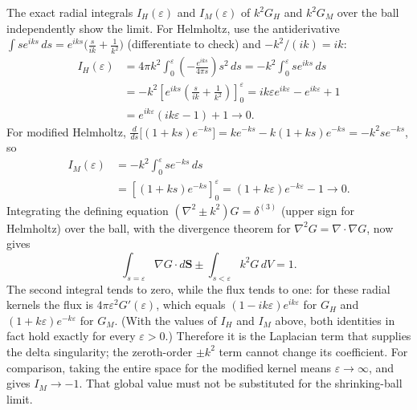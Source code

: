 The exact radial integrals $I_H(\varepsilon)$ and $I_M(\varepsilon)$ of
$k^2G_H$ and $k^2G_M$ over the ball independently show the limit.
For Helmholtz, use the antiderivative
$\int se^{iks}\,ds=e^{iks}\bigl(\frac{s}{ik}+\frac1{k^2}\bigr)$
(differentiate to check) and $-k^2/(ik)=ik$:
\begin{align*}
I_H(\varepsilon)&=4\pi k^2\int_0^\varepsilon
\left(-\frac{e^{iks}}{4\pi s}\right)s^2\,ds
=-k^2\int_0^\varepsilon s e^{iks}\,ds\\
&=-k^2\left[e^{iks}\left(\frac{s}{ik}+\frac1{k^2}\right)\right]_0^\varepsilon
=ik\varepsilon e^{ik\varepsilon}-e^{ik\varepsilon}+1\\
&=e^{ik\varepsilon}(ik\varepsilon-1)+1\longrightarrow0.
\end{align*}
For modified Helmholtz,
$\frac{d}{ds}\bigl[(1+ks)e^{-ks}\bigr]=ke^{-ks}-k(1+ks)e^{-ks}
=-k^2se^{-ks}$, so
\begin{align*}
I_M(\varepsilon)&=-k^2\int_0^\varepsilon s e^{-ks}\,ds\\
&=\left[(1+ks)e^{-ks}\right]_0^\varepsilon
=(1+k\varepsilon)e^{-k\varepsilon}-1\longrightarrow0.
\end{align*}
Integrating the defining equation $(\nabla^2\pm k^2)G=\delta^{(3)}$
(upper sign for Helmholtz) over the ball, with the divergence theorem for
$\nabla^2G=\nabla\cdot\nabla G$, now gives
\[
\int_{s=\varepsilon}\nabla G\cdot d\mathbf S
\ \mathord{\pm}\ \int_{s<\varepsilon}k^2G\,dV=1.
\]
The second integral tends to zero, while the flux tends to one: for
these radial kernels the flux is $4\pi\varepsilon^2G'(\varepsilon)$,
which equals $(1-ik\varepsilon)e^{ik\varepsilon}$ for $G_H$ and
$(1+k\varepsilon)e^{-k\varepsilon}$ for $G_M$. (With the values of
$I_H$ and $I_M$ above, both identities in fact hold exactly for every
$\varepsilon>0$.)
Therefore it is the Laplacian term that supplies the delta singularity;
the zeroth-order $\pm k^2$ term cannot change its coefficient.
For comparison, taking the entire space for the modified kernel means
$\varepsilon\to\infty$, and gives $I_M\to-1$. That global value must
not be substituted for the shrinking-ball limit.

